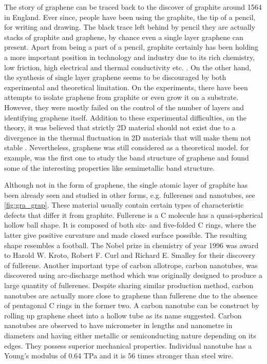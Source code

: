 The story of graphene can be traced back to the discover of graphite around 1564 in England\cite{petroski1990pencil}. Ever since, people have been using the graphite, the tip of a pencil, for writing and drawing. The black trace left behind by pencil they are actually stacks of graphite and graphene, by chance even a single layer graphene can present.  Apart from being a part of a pencil, graphite certainly has been holding a more important position in technology and industry due to its rich chemistry, low friction, high electrical and thermal conductivity etc. . On the other hand, the synthesis of single layer graphene seems to be discouraged by both experimental and theoretical limitation. On the experiments, there have been attempts\cite{Krishnan1997,Ohashi1997,Dresselhaus2002,Shioyama2001} to isolate graphene from graphite or even grow it on a substrate. However, they were mostly failed on the control of the number of layers and identifying graphene itself.  Addition to these experimental difficulties, on the theory, it was believed that strictly 2D material should not exist due to a divergence in the thermal fluctuation in 2D materials that will make them not stable \cite{Peierls1935,Landau1937,Mermin1968}. Nevertheless, graphene was still considered as a theoretical model. for example, \citet{Wallace1947} was the first one to study the band structure of graphene \cite{CastroNeto2009} and found some of the interesting properties like semimetallic band structure. 

Although not in the form of graphene, the single atomic layer of graphite has been already seen and studied in other forms, e.g. fullerenes and nanotubes, see \autoref{fig:gra_grap}. These material usually contain certain types of characteristic defects that differ it from graphite.  Fullerene is a C molecule has a quasi-spherical hollow ball shape. It is composed of both six- and five-folded C rings, where the latter give positive curvature and made closed surface possible. The resulting shape resembles a football\cite{Kroto1985,Lamb1990}. The Nobel prize in chemistry of year 1996 was award to Harold W. Kroto, Robert F. Curl and Richard E. Smalley for their discovery of fullerene. Another important type of carbon allotrope, carbon nanotubes\cite{Iijima1993}, was discovered using arc-discharge method\cite{Lamb1990} which was originally designed to produce a large quantity of fullerenes. Despite sharing similar production method, carbon nanotubes are actually more close to graphene than fullerene due to the absence of pentagonal C rings in the former two. A carbon nanotube can be construct by rolling up graphene sheet into a hollow tube as its name suggested. Carbon nanotubes are observed to have micrometer in lengths and nanometre in diameters and having either metallic or semiconducting nature depending on its edges. They possess superior mechanical properties. Individual nanotube has a Young's modulus of 0.64 TPa and it is 56 times stronger than steel wire\cite{Baughman787}.

